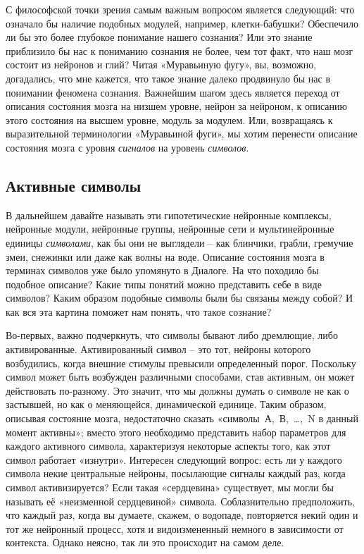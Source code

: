 \documentclass[../main.tex]{subfiles}
\begin{document}
С философской точки зрения самым важным вопросом является следующий: что означало бы наличие подобных модулей, например, клетки-бабушки? Обеспечило ли бы это более глубокое понимание нашего сознания? Или это знание приблизило бы нас к пониманию сознания не более, чем тот факт, что наш мозг состоит из нейронов и глий? Читая «Муравьиную фугу», вы, возможно, догадались, что мне кажется, что такое знание далеко продвинуло бы нас в понимании феномена сознания. Важнейшим шагом здесь является переход от описания состояния мозга на низшем уровне, нейрон за нейроном, к описанию этого состояния на высшем уровне, модуль за модулем. Или, возвращаясь к выразительной терминологии «Муравьиной фуги», мы хотим перенести описание состояния мозга с уровня \emph{сигналов} на уровень \emph{символов}.


\subsection{Активные символы}

В дальнейшем давайте называть эти гипотетические нейронные комплексы, нейронные модули, нейронные группы, нейронные сети и мультинейронные единицы \emph{символами}, как бы они не выглядели \--- как блинчики, грабли, гремучие змеи, снежинки или даже как волны на воде. Описание состояния мозга в терминах символов уже было упомянуто в Диалоге. На что походило бы подобное описание? Какие типы понятий можно представить себе в виде символов? Каким образом подобные символы были бы связаны между собой? И как вся эта картина поможет нам понять, что такое сознание?

Во-первых, важно подчеркнуть, что символы бывают либо дремлющие, либо активированные. Активированный символ \--- это тот, нейроны которого возбудились, когда внешние стимулы превысили определенный порог. Поскольку символ может быть возбужден различными способами, став активным, он может действовать по-разному. Это значит, что мы должны думать о символе не как о застывшей, но как о меняющейся, динамической единице. Таким образом, описывая состояние мозга, недостаточно сказать «символы~А,~В,~\dots,~N в данный момент активны»; вместо этого необходимо представить набор параметров для каждого активного символа, характеризуя некоторые аспекты того, как этот символ работает «изнутри». Интересен следующий вопрос: есть ли у каждого символа некие центральные нейроны, посылающие сигналы каждый раз, когда символ активизируется? Если такая «сердцевина» существует, мы могли бы называть её «неизменной сердцевиной» символа. Соблазнительно предположить, что каждый раз, когда вы думаете, скажем, о водопаде, повторяется некий один и тот же нейронный процесс, хотя и видоизмененный немного в зависимости от контекста. Однако неясно, так ли это происходит на самом деле.
\end{document}
